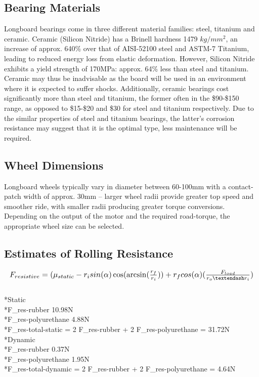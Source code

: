 \documentclass[journal,10pt]{IEEEtran}
\begin{document}
    \subsection{Bearing Materials}
        Longboard bearings come in three different material families: steel, titanium and ceramic. Ceramic (Silicon Nitride) has a Brinell hardness 1479 $kg/mm^{2}$, an increase of approx. 640\% over that of AISI-52100 steel and ASTM-7 Titanium, leading to reduced energy loss from elastic deformation. However, Silicon Nitride exhibits a yield strength of 170MPa: approx. 64\% less than steel and titanium. Ceramic may thus be inadvisable as the board will be used in an environment where it is expected to suffer shocks. Additionally, ceramic bearings cost significantly more than steel and titanium, the former often in the \$90-\$150 range, as opposed to \$15-\$20 and \$30 for steel and titanium respectively. Due to the similar properties of steel and titanium bearings, the latter’s corrosion resistance may suggest that it is the optimal type, less maintenance will be required. 
    \subsection{Wheel Dimensions}
        Longboard wheels typically vary in diameter between 60-100mm with a contact-patch width of approx. 30mm – larger wheel radii provide greater top speed and smoother ride, with smaller radii producing greater torque conversions. Depending on the output of the motor and the required road-torque, the appropriate wheel size can be selected.
    \subsection{Estimates of Rolling Resistance}
        \begin{equation*}
        \resizebox{\columnwidth}{!}{%
            $F_{resistive} = (\mu _{static}  -  r_i sin(\alpha) \cos(\arcsin(\frac{r_f}{r_i}))  +  r_f cos(\alpha)(\frac{F_{load}}{r_o – r_i})$%
        }
    \end{equation*}
    {
    \\*Static
    \\*F_{res-rubber} \approx 10.98N	
    \\*F_{res-polyurethane} \approx 4.88N
    \\*F_{res-total-static} = 2 F_{res-rubber} + 2 F_{res-polyurethane} = 31.72N 
    \\*Dynamic
    \\*F_{res-rubber} \approx 0.37N	
    \\*F_{res-polyurethane} \approx 1.95N
    \\*F_{res-total-dynamic} = 2 F_{res-rubber} + 2 F_{res-polyurethane} = 4.64N}
\end{document}
